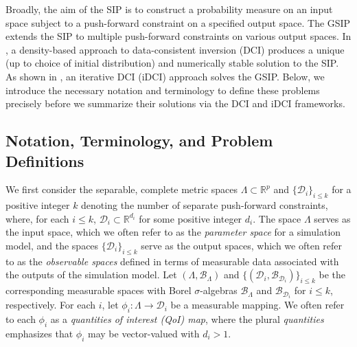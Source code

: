 \documentclass{article}
\newcommand{\B}{\mathcal{B}}
\begin{document}
Broadly, the aim of the SIP is to construct a probability measure on an input space subject to a push-forward constraint on a specified output space.
The GSIP extends the SIP to multiple push-forward constraints on various output spaces.
In \cite{BJW18a}, a density-based approach to data-consistent inversion (DCI) produces a unique (up to choice of initial distribution) and numerically stable solution to the SIP.
As shown in \cite{JBW+26}, an iterative DCI (iDCI) approach solves the GSIP.
Below, we introduce the necessary notation and terminology to define these problems precisely before we summarize their solutions via the DCI and iDCI frameworks.

\subsection{Notation, Terminology, and Problem Definitions}

We first consider the separable, complete metric spaces $\Lambda\subset\mathbb{R}^p$ and $\{\mathcal{D}_{i}\}_{i \le k}$ for a positive integer $k$ denoting the number of separate push-forward constraints, where, for each $i\le k$, $\mathcal{D}_i\subset\mathbb{R}^{d_i}$ for some positive integer $d_i$.
The space $\Lambda$ serves as the input space, which we often refer to as the {\em parameter space} for a simulation model, and the spaces $\{\mathcal{D}_i\}_{i\le k}$ serve as the output spaces, which we often refer to as the {\em observable spaces} defined in terms of measurable data associated with the outputs of the simulation model.
Let $(\Lambda, \B_{\Lambda})$ and $\{(\mathcal{D}_{i}, \B_{\mathcal{D}_{i}})\}_{i \le k}$ be the corresponding measurable spaces with Borel $\sigma$-algebras $\B_{\Lambda}$ and $\B_{\mathcal{D}_{i}}$ for $i\le k$, respectively.
For each $i$, let $\phi_{i}: \Lambda \rightarrow \mathcal{D}_{i}$ be a measurable mapping.
We often refer to each $\phi_i$ as a {\em quantities of interest (QoI) map}, where the plural {\em quantities} emphasizes that $\phi_i$ may be vector-valued with $d_i>1$.
\end{document}
